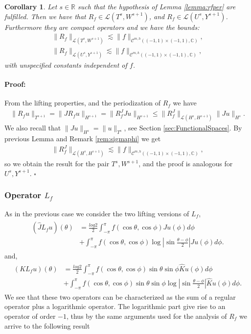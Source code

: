 \documentclass{article}
\newtheorem{corollary}[theorem]{Corollary}
\newenvironment{proof}{\paragraph{Proof:}}{\hfill$\square$}
\newcommand{\IC}{{\mathbb C}}
\newcommand{\IR}{{\mathbb R}}
\newcommand{\cmspaceh}[4]{\mathcal{C}^{#1,#2} \left( #3, #4 \right)}
\newcommand{\iinterv}{(-1,1)\times(-1,1)}
\begin{document}
\begin{corollary}
\label{corollary:rfop}
Let $s  \in \IR$ such that the hypothesis of Lemma \ref{lemma:rfper} are fulfilled. Then we have that 
$R_f  \in \mathcal{L}(T^{s},W^{s+1})$, and $R_f \in \mathcal{L}(U^{s},Y^{s+1})$. Furthermore they are compact operators and we have the bounds:
\begin{align*}
\| R_f\|_{ \mathcal{L}(T^{s},W^{s+1})} \lesssim \|f\|_{\cmspaceh{m}{h}{\iinterv}{\IC}},\\
\| R_f\|_{ \mathcal{L}(U^{s},Y^{s+1})} \lesssim \|f\|_{\cmspaceh{m}{h}{\iinterv}{\IC}},
\end{align*}
with unspecified constants independent of $f$.
\end{corollary}
\begin{proof}
From the lifting properties, and the periodization of $R_f$ we have 
\begin{align*}
\| R_f u\|_{T^{s+1}} = \|  J R_f u \|_{H^{s+1}} = \|R_f^J Ju \|_{H^{s+1}} \leq \| R_f^J\|_{\mathcal{L}(H^{s},H^{s+1})} \|J u \|_{H^{s}}. 
\end{align*}
We also recall that $\|J u \|_{H^{s}} = \|u\|_{T^{s}}$, see Section \ref{sec:FunctionalSpaces}. By previous Lemma and Remark \ref{rem:sigmaphi} we get 
\begin{align*}
\| R_f^J\|_{\mathcal{L}(H^{s},H^{s+1})} \lesssim \|f\|_{\cmspaceh{m}{h}{\iinterv}{\IC}},
\end{align*}
so we obtain the result for the pair $T^{s}, W^{s+1}$, and the proof is analogous for $U^{s},Y^{s+1}$.
\end{proof}
\subsubsection{Operator $L_f$}

As in the previous case we consider the two lifting versions of $L_f$, 
\begin{align}
\label{eq:Lsplit}
\begin{split}
(\widehat{J}L_fu)(\theta) &= \frac{log{2}}{2} \int_{-\pi}^{\pi} f(\cos \theta , \cos \phi) Ju(\phi) d\phi \\&+ \int_{-\pi}^{\pi} f(\cos \theta, \cos \phi) \log \left\vert \sin \frac{\theta-\phi}{2} \right\vert Ju(\phi) d\phi.
\end{split}
\end{align}
and, 
\begin{align}
\label{eq:Lsplitodd}
\begin{split}
(KL_fu)(\theta) &= \frac{log{2}}{2} \int_{-\pi}^{\pi} f(\cos \theta , \cos \phi)\sin \theta \sin \phi \widehat{K}u(\phi) d\phi \\&+ \int_{-\pi}^{\pi} f(\cos \theta, \cos \phi)\sin \theta \sin \phi \log \left\vert \sin \frac{\theta-\phi}{2} \right\vert \widehat{K}u(\phi) d\phi.
\end{split}
\end{align}
We see that these two operators can be characterized as the sum of a regular operator plus a logarithmic operator. The logarithmic part give rise to an operator of order $-1$, thus by the same arguments used for the analysis of $R_f$ we arrive to the following result  
\end{document}
